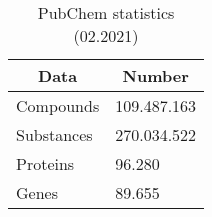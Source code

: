\begin{table}
\caption{PubChem statistics (02.2021)}
\centering
\begin{tabular}{|l|l|}
\hline
\multicolumn{1}{|c|}{\textbf{Data}} & \multicolumn{1}{c|}{\textbf{Number}} \\ \hline
Compounds                           & 109.487.163                          \\ \hline
Substances                          & 270.034.522                          \\ \hline
Proteins                            & 96.280                               \\ \hline
Genes                               & 89.655                               \\ \hline
\end{tabular}
\label{tab:pubchem_stats}
\end{table}